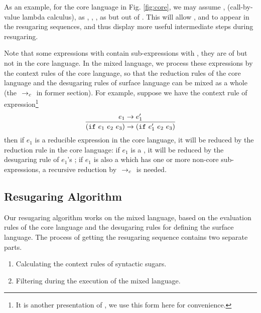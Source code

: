 


As an example, for the core language in Fig.  \ref{fig:core},
we may assume , \m{$\lambda$} (call-by-value lambda calculus),  as , , ,  as  but out of . This will allow , \m{$\lambda$} and  to appear in the resugaring sequences, and thus display more useful intermediate steps during resugaring.

Note that some expressions with  contain sub-expressions with , they are of  but not in the core language. In the mixed language, we process these expressions by the context rules of the core language, so that the reduction rules of the core language and the desugaring rules of surface language can be mixed as a whole (the $~\rightarrow_c~$ in former section). For example, suppose we have the context rule of  expression\footnote{It is another presentation of , we use this form here for convenience.}
\[
\infer{(\m{if}~e_1~e_2~e_3) \rightarrow (\m{if}~e_1'~e_2~e_3)}{e_1 \rightarrow e_1'}
\]
then if $e_1$ is a reducible expression in the core language, it will be reduced by the reduction rule in the core language: if $e_1$ is a , it will be reduced by the desugaring rule of $e_1$'s ; if $e_1$ is also a  which has one or more non-core sub-expressions, a recursive reduction by $~\rightarrow_c~$ is needed.


\subsection{Resugaring Algorithm}

Our resugaring algorithm works on the mixed language, based on the evaluation rules of the core language and the desugaring rules for defining the surface language. The process of  getting the resugaring sequence contains two separate parts.

\begin{enumerate}
\item Calculating the context rules of syntactic sugars.
\item Filtering  during the execution of the mixed language.
\end{enumerate}

